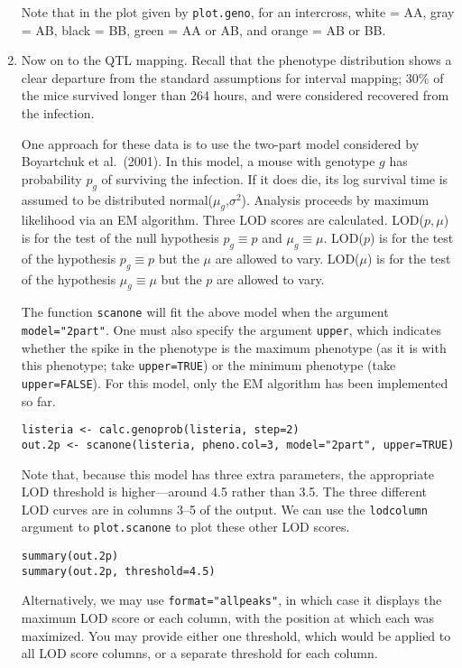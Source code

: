 \documentclass[10pt,letterpaper]{article}
\newcommand{\usercolor}{\color [named]{BlueViolet}}
\begin{document}
\begin{enumerate}
Note that in the plot given by \verb-plot.geno-, for an intercross,
white = AA, gray = AB, black = BB, green = AA or AB, and orange = AB
or BB.

\item Now on to the QTL mapping.  Recall that the phenotype
distribution shows a clear departure from the standard assumptions for
interval mapping; 30\% of the mice survived longer than 264 hours, and
were considered recovered from the infection.

One approach for these data is to use the two-part model considered by
Boyartchuk et al.\ (2001).  In this model, a mouse with genotype $g$
has probability $p_g$ of surviving the infection.  If it does die, its
log survival time is assumed to be distributed
normal($\mu_g$,$\sigma^2$).  Analysis proceeds by maximum likelihood
via an EM algorithm.  Three LOD scores are calculated.  LOD($p,\mu$)
is for the test of the null hypothesis $p_g \equiv p$ and $\mu_g
\equiv \mu$.  LOD($p$) is for the test of the hypothesis $p_g \equiv
p$ but the $\mu$ are allowed to vary.  LOD($\mu$) is for the test of
the hypothesis $\mu_g \equiv \mu$ but the $p$ are allowed to vary.

The function \verb-scanone- will fit the above model when the argument
\verb-model="2part"-.  One must also specify the argument
\verb-upper-, which indicates whether the spike in the phenotype is
the maximum phenotype (as it is with this phenotype; take
\verb-upper=TRUE-) or the minimum phenotype (take \verb-upper=FALSE-).
For this model, only the EM algorithm has been implemented so far.

\usercolor
\verb|listeria <- calc.genoprob(listeria, step=2)| \\
\verb|out.2p <- scanone(listeria, pheno.col=3, model="2part", upper=TRUE)|
\normalcolor

Note that, because this model has three extra parameters, the
appropriate LOD threshold is higher---around 4.5 rather than 3.5.  The
three different LOD curves are in columns 3--5 of the output.  We can
use the \verb-lodcolumn- argument to \verb-plot.scanone- to plot these
other LOD scores.

\usercolor
\verb|summary(out.2p)| \\
\verb|summary(out.2p, threshold=4.5)| 
\normalcolor

Alternatively, we may use \verb-format="allpeaks"-, in which case it
displays the maximum LOD score or each column, with the position at
which each was maximized.  You may provide either one threshold, which
would be applied to all LOD score columns, or a separate threshold for
each column.


\end{enumerate}
\end{document}
